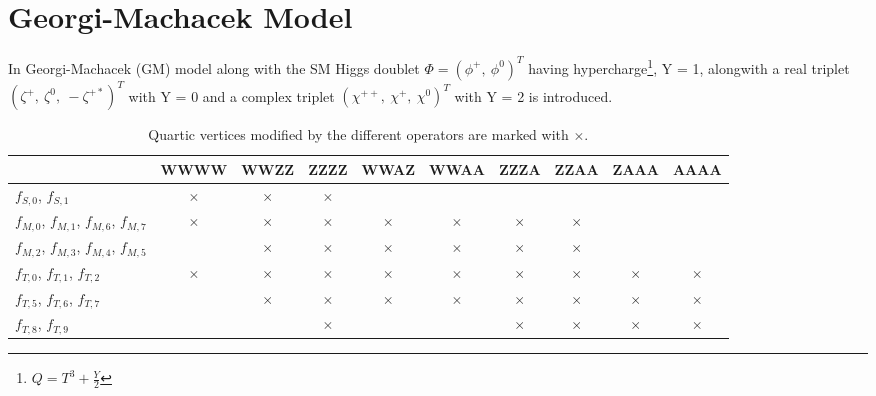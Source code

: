 


\section{Georgi-Machacek Model} %
\label{sec:georgi_machacek_model}
In Georgi-Machacek (GM) model along with the SM Higgs doublet $\Phi = (\phi^+,~\phi^0)^T$ having hypercharge\footnote{$Q = T^3 + \frac{Y}{2}$}, Y = 1, alongwith a real triplet $(\zeta^+,~\zeta^0,~-\zeta^{+*})^T$ with Y = 0 and a complex triplet $(\chi^{++},~\chi^+,~\chi^0)^T$ with Y = 2 is introduced.

\begin{table}
{\footnotesize
\centering
\begin{tabular}[!htbp]{|p{1.8cm} | c  |c  |c  |c  |c  |c  |c | c  |c |}
\hline
    & WWWW & WWZZ & ZZZZ & WWAZ & WWAA & ZZZA & ZZAA & ZAAA & AAAA \\
\hline
$f_{S,0}$, $f_{S,1}$ &$\times$ & $\times$&$\times$ & & & & & & \\
\hline
$f_{M,0}$, $f_{M,1}$, $f_{M,6}$, $f_{M,7}$  &$\times$ &$\times$ &$\times$ &$\times$ &$\times$ &$\times$ &$\times$ & & \\
\hline
$f_{M,2}$, $f_{M,3}$, $f_{M,4}$, $f_{M,5}$  & &$\times$ &$\times$ &$\times$ &$\times$ &$\times$ &$\times$ & & \\
\hline
$f_{T,0}$, $f_{T,1}$, $f_{T,2}$ &$\times$ &$\times$ &$\times$ &$\times$ &$\times$ &$\times$ &$\times$ &$\times$ &$\times$ \\
\hline
$f_{T,5}$, $f_{T,6}$, $f_{T,7}$ & &$\times$ &$\times$ &$\times$ &$\times$ &$\times$ &$\times$ &$\times$ &$\times$ \\
\hline
$f_{T,8}$, $f_{T,9}$  & & &$\times$ & & &$\times$ &$\times$ &$\times$ &$\times$ \\
\hline
\end{tabular}
\caption{Quartic vertices modified by the different operators are marked with $\times$.}
\label{table:aQGC_alloperator}
}
\end{table}

